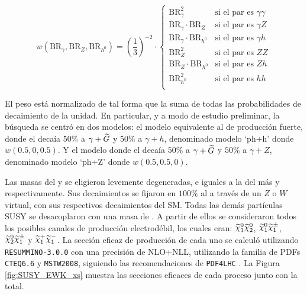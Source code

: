 

\begin{equation}
  w(\text{BR}_{\gamma}, \text{BR}_{Z}, \text{BR}_{h^{0}})=\left(\frac{1}{3}\right)^{-2}\cdot\begin{cases}
    \text{BR}_{\gamma}^{2} & \text{si el par es } \gamma\gamma \\
    \text{BR}_{\gamma}\cdot\text{BR}_{Z} & \text{si el par es } \gamma Z \\
    \text{BR}_{\gamma}\cdot\text{BR}_{h^{0}} & \text{si el par es } \gamma h \\
    \text{BR}_{Z}^{2} & \text{si el par es } ZZ \\
    \text{BR}_{Z}\cdot\text{BR}_{h^{0}} & \text{si el par es } Zh \\
    \text{BR}_{h^{0}}^{2} & \text{si el par es } hh \\
  \end{cases}
\end{equation}

El peso está normalizado de tal forma que la suma de todas las probabilidades de decaimiento de la unidad. En particular, y a modo de estudio preliminar, la búsqueda se centró en dos modelos: el modelo equivalente al de producción fuerte, donde el \ninoone decaía $50\%$ a $\gamma + \widetilde{G}$ y $50\%$ a $\gamma + h$, denominado modelo `ph+h' donde $w(0.5, 0, 0.5)$. Y el modelo donde el \ninoone decaía $50\%$ a $\gamma + \widetilde{G}$ y $50\%$ a $\gamma + Z$, denominado modelo `ph+Z' donde $w(0.5, 0.5, 0)$.

Las masas del \ninotwo y \chinopm se eligieron levemente degeneradas, e iguales a la del \ninoone más  y  respectivamente. 
Sus decaimientos se fijaron en $100\%$ al \ninoone a través de un $Z$ o $W$ virtual, con sus respectivos decaimientos del SM. Todas las demás partículas SUSY se desacoplaron con una masa de . A partir de ellos se consideraron todos los posibles canales de producción electrodébil, los cuales eran: $\ninoone \ninotwo$, $\ninoone \chinoonepm$, $\ninotwo \chinoonepm$ y $\chinoonep \chinoonem$. La sección eficaz de producción de cada uno se calculó utilizando \texttt{RESUMMINO-3.0.0} \cite{Beenakker:1999xh,Debove:2010kf,Fuks:2012qx,Fuks:2013vua,Fiaschi:2018hgm} con una precisión de NLO+NLL, utilizando la familia de PDFs \texttt{CTEQ6.6} y \texttt{MSTW2008}, siguiendo las recomendaciones de \texttt{PDF4LHC} \cite{Butterworth:2015oua}. La Figura \ref{fig:SUSY_EWK_xs} muestra las secciones eficaces de cada proceso junto con la total.

